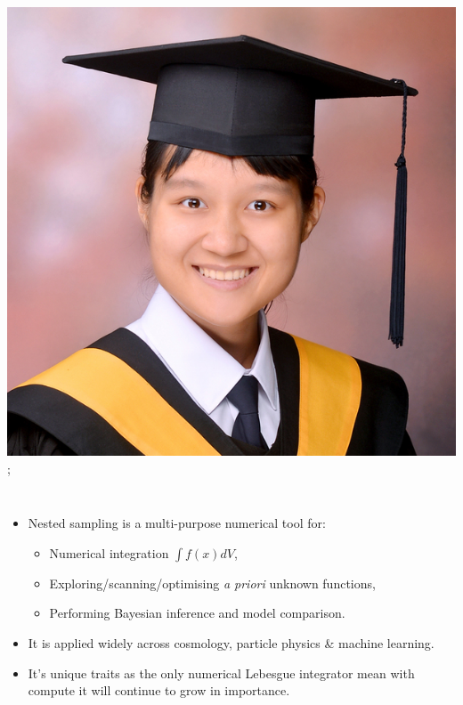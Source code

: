 \documentclass[aspectratio=169]{beamer}
\begin{document}
\begin{frame}
{            \includegraphics[width=0.1\textheight]{figures/students/wei-ning_deng.jpg}%
    };
    \vspace{-0.1\textheight}
    \begin{columns}
    \begin{itemize}
        \item Nested sampling is a multi-purpose numerical tool for:
            \begin{itemize}
                \item Numerical integration $\int f(x) dV$,
                \item Exploring/scanning/optimising \textit{a priori} unknown functions,
                \item Performing Bayesian inference and model comparison.
            \end{itemize}
        \item It is applied widely across cosmology, particle physics \& machine learning.
        \item It's unique traits as the only numerical Lebesgue integrator mean with compute it will continue to grow in importance.
    \end{itemize}

\end{columns}
\end{frame}
\end{document}
